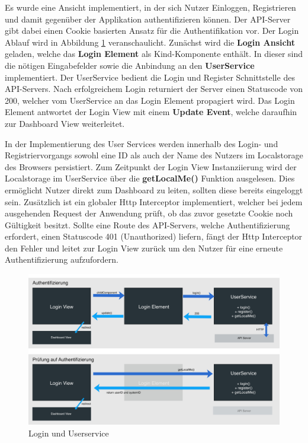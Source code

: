 Es wurde eine Ansicht implementiert, in der sich Nutzer Einloggen, Registrieren und damit gegenüber der Applikation authentifizieren können.
Der \ac{API}-Server gibt dabei einen Cookie basierten Ansatz für die Authentifikation vor. Der Login Ablauf wird in Abbildung \ref{kapitel4/login} veranschaulicht.
Zunächst wird die \textbf{Login Ansicht} geladen, welche das \textbf{Login Element} als Kind-Komponente enthält.
In dieser sind die nötigen Eingabefelder sowie die Anbindung an den \textbf{UserService} implementiert.
Der UserService bedient die Login und Register Schnittstelle des \ac{API}-Servers.
Nach erfolgreichem Login returniert der Server einen Statuscode von 200, welcher vom UserService an das Login Element propagiert wird.
Das Login Element antwortet der Login View mit einem \textbf{Update Event}, welche daraufhin zur Dashboard View weiterleitet.

In der Implementierung des User Services werden innerhalb des Login- und Registriervorgangs sowohl eine ID als auch der Name des Nutzers im Localstorage des Browsers persistiert.
Zum Zeitpunkt der Login View Instanziierung wird der Localstorage im UserService über die \textbf{getLocalMe()} Funktion ausgelesen.
Dies ermöglicht Nutzer direkt zum Dashboard zu leiten, sollten diese bereits eingeloggt sein.
Zusätzlich ist ein globaler Http Interceptor implementiert, welcher bei jedem ausgehenden Request der Anwendung prüft, ob das zuvor gesetzte Cookie noch Gültigkeit besitzt.
Sollte eine Route des \ac{API}-Servers, welche Authentifizierung erfordert, einen Statuscode 401 (Unauthorized) liefern,
fängt der Http Interceptor den Fehler und leitet zur Login View zurück um den Nutzer für eine erneute Authentifizierung aufzufordern.


\begin{figure}[h]
 \centering
 \includegraphics[width=\linewidth]{kapitel4/login.jpg}
 \caption{Login und Userservice}
 \label{kapitel4/login}
\end{figure}
\vspace{0.3cm}



